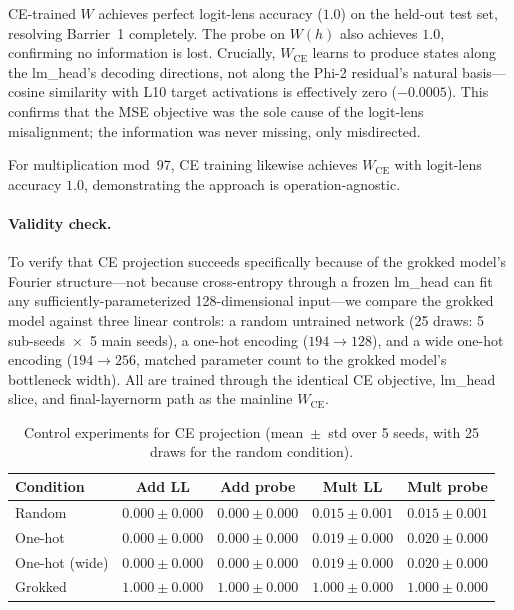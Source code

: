 \documentclass{article}
\begin{document}
CE-trained $W$ achieves perfect logit-lens accuracy ($1.0$) on the held-out
test set, resolving Barrier~1 completely.  The probe on $W(h)$ also achieves
$1.0$, confirming no information is lost.  Crucially, $W_{\text{CE}}$ learns
to produce states along the lm\_head's decoding directions, not along the
Phi-2 residual's natural basis---cosine similarity with L10 target
activations is effectively zero ($-0.0005$).  This confirms that the MSE
objective was the sole cause of the logit-lens misalignment; the information
was never missing, only misdirected.

For multiplication mod~97, CE training likewise achieves $W_{\text{CE}}$
with logit-lens accuracy $1.0$, demonstrating the approach is
operation-agnostic.

\paragraph{Validity check.}
To verify that CE projection succeeds specifically because of the grokked
model's Fourier structure---not because cross-entropy through a frozen
lm\_head can fit any sufficiently-parameterized 128-dimensional input---we
compare the grokked model against three linear controls: a random untrained
network (25 draws: 5 sub-seeds~$\times$~5 main seeds), a one-hot encoding
($194\rightarrow128$), and a wide one-hot encoding
($194\rightarrow256$, matched parameter count to the grokked model's
bottleneck width).  All are trained through the identical CE objective,
lm\_head slice, and final-layernorm path as the mainline $W_{\text{CE}}$.

\begin{table}[ht]
  \centering
  \caption{Control experiments for CE projection (mean~$\pm$~std over 5 seeds,
            with 25 draws for the random condition).}
  \label{tab:controls}
  \begin{tabular}{lcccc}
    \toprule
    Condition & Add LL & Add probe & Mult LL & Mult probe \\
    \midrule
    Random & $0.000 \pm 0.000$ & $0.000 \pm 0.000$ & $0.015 \pm 0.001$ & $0.015 \pm 0.001$ \\
    One-hot & $0.000 \pm 0.000$ & $0.000 \pm 0.000$ & $0.019 \pm 0.000$ & $0.020 \pm 0.000$ \\
    One-hot (wide) & $0.000 \pm 0.000$ & $0.000 \pm 0.000$ & $0.019 \pm 0.000$ & $0.020 \pm 0.000$ \\
    \midrule
    Grokked & $1.000 \pm 0.000$ & $1.000 \pm 0.000$ & $1.000 \pm 0.000$ & $1.000 \pm 0.000$ \\
    \bottomrule
  \end{tabular}
\end{table}
\end{document}
